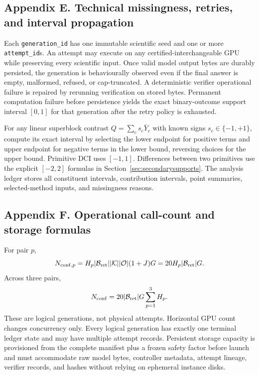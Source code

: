 \documentclass[11pt,a4paper]{article}
\newcommand{\Bret}{\mathcal B_{\mathrm{ret}}}
\begin{document}
\subsection*{Appendix E. Technical missingness, retries, and interval propagation}
Each \texttt{generation\_id} has one immutable scientific seed and one or more \texttt{attempt\_id}s. An attempt may execute on any certified-interchangeable GPU while preserving every scientific input. Once valid model output bytes are durably persisted, the generation is behaviourally observed even if the final answer is empty, malformed, refused, or cap-truncated. A deterministic verifier operational failure is repaired by rerunning verification on stored bytes. Permanent computation failure before persistence yields the exact binary-outcome support interval $[0,1]$ for that generation after the retry policy is exhausted.

For any linear superblock contrast $Q=\sum_c s_c\bar Y_c$ with known signs $s_c\in\{-1,+1\}$, compute its exact interval by selecting the lower endpoint for positive terms and upper endpoint for negative terms in the lower bound, reversing choices for the upper bound. Primitive DCI uses $[-1,1]$. Differences between two primitives use the explicit $[-2,2]$ formulas in Section~\ref{sec:secondarysupports}. The analysis ledger stores all constituent intervals, contribution intervals, point summaries, selected-method inputs, and missingness reasons.

\subsection*{Appendix F. Operational call-count and storage formulas}
For pair $p$,
\[
N_{{\rm conf},p}=H_p|\Bret||\mathcal K||\mathcal O|(1+J)G=20H_p|\Bret|G.
\]
Across three pairs,
\[
N_{\rm conf}=20|\Bret|G\sum_{p=1}^{3}H_p.
\]
These are logical generations, not physical attempts. Horizontal GPU count changes concurrency only. Every logical generation has exactly one terminal ledger state and may have multiple attempt records. Persistent storage capacity is provisioned from the complete manifest plus a frozen safety factor before launch and must accommodate raw model bytes, controller metadata, attempt lineage, verifier records, and hashes without relying on ephemeral instance disks.
\end{document}

